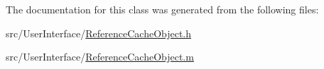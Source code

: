 The documentation for this class was generated from the following files\-:\begin{DoxyCompactItemize}
\item 
src/\-User\-Interface/\hyperlink{_reference_cache_object_8h}{Reference\-Cache\-Object.\-h}\item 
src/\-User\-Interface/\hyperlink{_reference_cache_object_8m}{Reference\-Cache\-Object.\-m}\end{DoxyCompactItemize}
